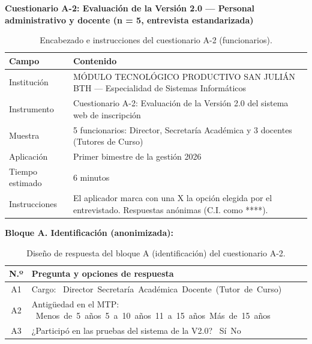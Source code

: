 \vspace{0.4cm}
\Needspace{7cm}
\noindent\textbf{Cuestionario A-2: Evaluación de la Versión 2.0 --- Personal administrativo y docente (n = 5, entrevista estandarizada)}

\begin{table}[H]
    \centering
    \caption{Encabezado e instrucciones del cuestionario A-2 (funcionarios).}
    \label{tab:a2_encabezado}
    \begin{tabularx}{\textwidth}{p{} X}
        \toprule
        \textbf{Campo} & \textbf{Contenido} \\
        \midrule
        Institución & MÓDULO TECNOLÓGICO PRODUCTIVO SAN JULIÁN BTH --- Especialidad de Sistemas Informáticos \\
        Instrumento & Cuestionario A-2: Evaluación de la Versión 2.0 del sistema web de inscripción \\
        Muestra & 5 funcionarios: Director, Secretaría Académica y 3 docentes (Tutores de Curso) \\
        Aplicación & Primer bimestre de la gestión 2026 \\
        Tiempo estimado & 6 minutos \\
        Instrucciones & El aplicador marca con una X la opción elegida por el entrevistado. Respuestas anónimas (C.I. como ****). \\
        \bottomrule
    \end{tabularx}
\end{table}

\Needspace{6cm}
\noindent\textbf{Bloque A. Identificación (anonimizada):}

\begin{table}[H]
    \centering
    \caption{Diseño de respuesta del bloque A (identificación) del cuestionario A-2.}
    \label{tab:a2_identificacion}
    \renewcommand{\arraystretch}{1.60}
    \begin{tabularx}{\textwidth}{c L}
        \toprule
        \textbf{N.º} & \textbf{Pregunta y opciones de respuesta} \\
        \midrule
        A1 & Cargo:\newline
            \mbox{\casilla{} Director}\quad \mbox{\casilla{} Secretaría Académica}\quad \mbox{\casilla{} Docente (Tutor de Curso)} \\
        \addlinespace
        A2 & Antigüedad en el MTP:\newline
            \mbox{\casilla{} Menos de 5 años}\quad \mbox{\casilla{} 5 a 10 años}\quad \mbox{\casilla{} 11 a 15 años}\quad \mbox{\casilla{} Más de 15 años} \\
        \addlinespace
        A3 & ¿Participó en las pruebas del sistema de la V2.0?\newline
            \mbox{\casilla{} Sí}\quad \mbox{\casilla{} No} \\
        \bottomrule
    \end{tabularx}
\end{table}

